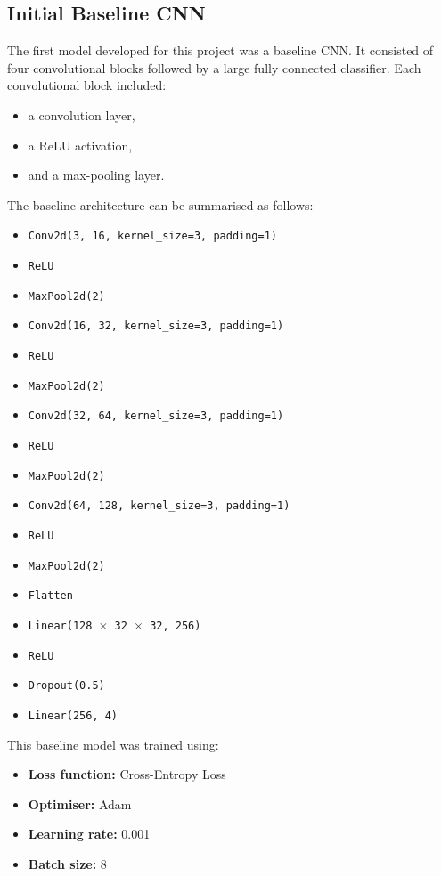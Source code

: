 \documentclass{article}
\begin{document}
\subsection{Initial Baseline CNN}

The first model developed for this project was a baseline CNN. It consisted of four convolutional blocks followed by a large fully connected classifier. Each convolutional block included:
\begin{itemize}
    \item a convolution layer,
    \item a ReLU activation,
    \item and a max-pooling layer.
\end{itemize}

The baseline architecture can be summarised as follows:
\begin{itemize}
    \item \texttt{Conv2d(3, 16, kernel\_size=3, padding=1)}
    \item \texttt{ReLU}
    \item \texttt{MaxPool2d(2)}
    \item \texttt{Conv2d(16, 32, kernel\_size=3, padding=1)}
    \item \texttt{ReLU}
    \item \texttt{MaxPool2d(2)}
    \item \texttt{Conv2d(32, 64, kernel\_size=3, padding=1)}
    \item \texttt{ReLU}
    \item \texttt{MaxPool2d(2)}
    \item \texttt{Conv2d(64, 128, kernel\_size=3, padding=1)}
    \item \texttt{ReLU}
    \item \texttt{MaxPool2d(2)}
    \item \texttt{Flatten}
    \item \texttt{Linear(128 $\times$ 32 $\times$ 32, 256)}
    \item \texttt{ReLU}
    \item \texttt{Dropout(0.5)}
    \item \texttt{Linear(256, 4)}
\end{itemize}

This baseline model was trained using:
\begin{itemize}
    \item \textbf{Loss function:} Cross-Entropy Loss
    \item \textbf{Optimiser:} Adam
    \item \textbf{Learning rate:} 0.001
    \item \textbf{Batch size:} 8
\end{itemize}
\end{document}
